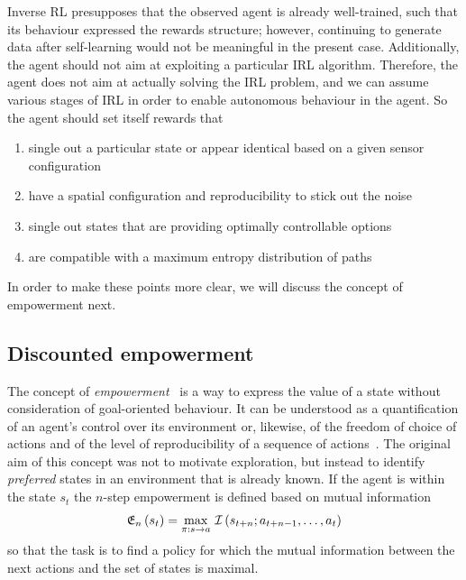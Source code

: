 \documentclass{article}
\begin{document}
Inverse RL presupposes that the observed agent is already well-trained, such that 
its behaviour expressed the rewards structure; however, continuing to generate data after
self-learning would not be meaningful in the present case. Additionally, the agent should not aim
at exploiting a particular IRL algorithm. Therefore, the agent does not aim at actually 
solving the IRL problem, and we can assume various stages of IRL in order 
to enable autonomous behaviour in the agent. So the agent should set itself rewards that
\begin{enumerate}
\item single out a particular state or appear identical based on a given sensor configuration
\item have a spatial configuration and reproducibility to stick out the noise
\item single out states that are providing optimally controllable options
\item are compatible with a maximum entropy distribution of paths
\end{enumerate}
In order to make these points more clear, we will discuss the concept of empowerment next.


\subsection{Discounted empowerment\label{emp}\label{gammares}}

The concept of \emph{empowerment}~\cite{klyubin2005empowerment} is a way to 
express the value of a state without consideration of goal-oriented behaviour.
It can be understood as a quantification of an agent's control over its environment
or, likewise, of the freedom of choice of actions and of the 
level of reproducibility of a sequence of actions~\cite{salge2014empowerment}.
The original aim  of this concept was not to motivate exploration, 
but instead to identify \emph{preferred} states in an environment that is already known.
If the agent is within the state $s_t$ the $n$-step empowerment is defined based on mutual 
information
\begin{equation}
\mathfrak{E}_{n}\left(s_{t}\right)=\max_{\pi:s\to a}\,{\cal I}\left(s_{t+n};a_{t+n-1},\dots,a_{t}\right)\label{eq:n_powerment}
\end{equation}
so that the task is to find a policy for which the mutual information between the next actions and the set of states is maximal.
\end{document}
